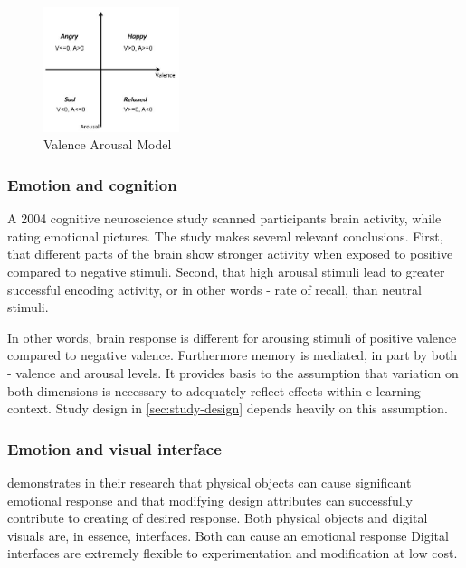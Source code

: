 		
		\begin{figure}
			\begin{center}
				\includegraphics[width=150px]{graphics/Valence-Arousal-model-showing-the-quadrants-of-the-four-emotion-tags-used-in-this_W640.jpg}
				\caption{Valence Arousal Model \cite{Song2013} \label{fig:valence_arousal_model}}
				
			\end{center}
		\end{figure}
		
		
		
		\subsubsection{Emotion and cognition} \label{sec:emotion-cognition}
		
		A 2004 cognitive neuroscience study \cite{Dolcos2004} scanned participants brain activity, while rating emotional pictures. The study makes several relevant conclusions. First, that different parts of the brain show stronger activity when exposed to positive compared to negative stimuli. Second, that high arousal stimuli lead to greater successful encoding activity, or in other words - rate of recall, than neutral stimuli. 
		
		In other words, brain response is different for arousing stimuli of positive valence compared to negative valence. Furthermore memory is mediated, in part by both - valence and arousal levels. It provides basis to the assumption that variation on both dimensions is necessary to adequately reflect effects within e-learning context. Study design in \ref{sec:study-design} depends heavily on this assumption.
		
		
		
		\subsubsection{Emotion and visual interface}
		
		\cite{Desmet2007} demonstrates in their research that physical objects can cause significant emotional response and that modifying design attributes can successfully contribute to creating of desired response.
		Both physical objects and digital visuals are, in essence, interfaces. Both can cause an emotional response \citationneeded Digital interfaces are extremely flexible to experimentation and modification at low cost.
		
